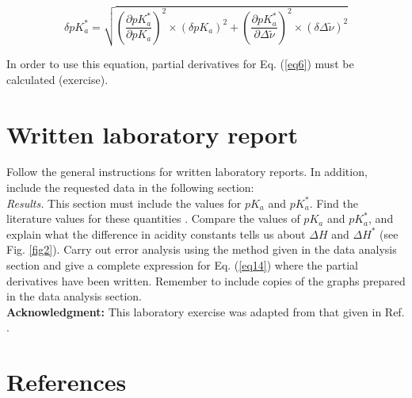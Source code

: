 \documentclass[byrevtex,amssymb,aps,pra,floatfix,letterpaper]{revtex4}
\begin{document}
\begin{equation}
\label{eq14}
\delta pK_a^* = \sqrt{\left(\frac{\partial pK_a^*}{\partial pK_a}\right)^2 \times \left(\delta pK_a\right)^2 + \left(\frac{\partial pK_a^*}{\partial\Delta\tilde{\nu}}\right)^2 \times \left(\delta\Delta\tilde{\nu}\right)^2}
\end{equation}

In order to use this equation, partial derivatives for Eq. (\ref{eq6}) must be calculated (exercise).

\section{Written laboratory report}

Follow the general instructions for written laboratory reports. In addition, include the requested data in the following section:\\

\noindent
\textit{Results.} This section must include the values for $pK_a$ and $pK_a^*$. Find the literature values for these quantities \cite{LOEFROTH}. Compare the values of $pK_a$ and $pK_a^*$, and explain what the difference in acidity constants tells us about $\Delta H$ and $\Delta H^*$ (see Fig. \ref{fig2}). Carry out error analysis using the method given in the data analysis section and give a complete expression for Eq. (\ref{eq14}) where the partial derivatives have been written. Remember to include copies of the graphs prepared in the data analysis section.\\

\noindent
\textbf{Acknowledgment:} This laboratory exercise was adapted from that given in Ref. \cite{MCBANE}.

\section{References}

\vspace{-1cm}


\end{document}
